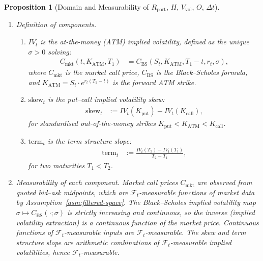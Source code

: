 \documentclass[12pt,openany]{book}
\newcommand{\calF}{\mathcal{F}}
\numberwithin{equation}{chapter}
\theoremstyle{plain}
\newtheorem{proposition}[theorem]{Proposition}
\theoremstyle{definition}
\theoremstyle{remark}
\numberwithin{equation}{chapter}
\theoremstyle{plain}
\begin{document}
\begin{proposition}[Domain and Measurability of $R_{\mathrm{port}}$,
  $H$, $V_{\mathrm{vol}}$, $O$, $\Delta t$]
\begin{enumerate}
    \begin{enumerate}
      \item \emph{Definition of components.}
        \begin{enumerate}
          \item $IV_t$ is the at-the-money (ATM) implied volatility,
            defined as the unique $\sigma > 0$ solving:
            \begin{align}
              C_{\mathrm{mkt}}(t, K_{\mathrm{ATM}}, T_1)
                &= C_{\mathrm{BS}}(S_t, K_{\mathrm{ATM}},
                   T_1 - t, r_t, \sigma),
            \end{align}
            where $C_{\mathrm{mkt}}$ is the market call price,
            $C_{\mathrm{BS}}$ is the Black--Scholes formula,
            and $K_{\mathrm{ATM}} = S_t \cdot e^{r_t(T_1 - t)}$
            is the forward ATM strike.
          \item $\mathrm{skew}_t$ is the put--call implied
            volatility skew:
            \begin{align}
              \mathrm{skew}_t
                &:= IV_t(K_{\mathrm{put}}) - IV_t(K_{\mathrm{call}}),
            \end{align}
            for standardised out-of-the-money strikes
            $K_{\mathrm{put}} < K_{\mathrm{ATM}}
              < K_{\mathrm{call}}$.
          \item $\mathrm{term}_t$ is the term structure slope:
            \begin{align}
              \mathrm{term}_t
                &:= \frac{IV_t(T_2) - IV_t(T_1)}{T_2 - T_1},
            \end{align}
            for two maturities $T_1 < T_2$.
        \end{enumerate}

      \item \emph{Measurability of each component.}
        Market call prices $C_{\mathrm{mkt}}$ are observed from
        quoted bid--ask midpoints, which are $\calF_t$-measurable
        functions of market data by
        Assumption~\ref{asm:filtered-space}.
        The Black--Scholes implied volatility map
        $\sigma \mapsto C_{\mathrm{BS}}(\cdot;\sigma)$ is
        strictly increasing and continuous, so the inverse
        (implied volatility extraction) is a continuous function
        of the market price.
        Continuous functions of $\calF_t$-measurable inputs
        are $\calF_t$-measurable.
        The skew and term structure slope are arithmetic
        combinations of $\calF_t$-measurable implied volatilities,
        hence $\calF_t$-measurable.


\end{enumerate}
\end{enumerate}
\end{proposition}
\end{document}
